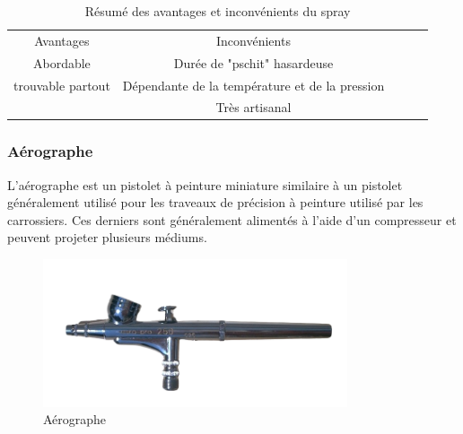 \begin{table}[H]
    \centering
    \begin{tabular}{|c|c|lll}
        \cline{1-2}
        Avantages                                 & Inconvénients                                                          &  &  & \\ \cline{1-2}
        \cellcolor[HTML]{67FD9A}Abordable         & \cellcolor[HTML]{FD6864}Durée de "pschit" hasardeuse                   &  &  & \\ \cline{1-2}
        \cellcolor[HTML]{67FD9A}trouvable partout & \cellcolor[HTML]{FD6864}Dépendante de la température et de la pression &  &  & \\ \cline{1-2}
                                                  & \cellcolor[HTML]{FD6864}Très artisanal                                 &  &  & \\ \cline{1-2}
    \end{tabular}
    \caption{Résumé des avantages et inconvénients du spray}
    \label{tab:hair_spray_table}
\end{table}

\newpage
\subsubsection{Aérographe} \label{section_aerographe}
L'aérographe est un pistolet à peinture miniature similaire à un pistolet généralement utilisé pour les traveaux de précision
à peinture utilisé par les carrossiers.
Ces derniers sont généralement alimentés à l'aide d'un compresseur et peuvent projeter plusieurs médiums.

\begin{figure}[H]
    \centering
    \includegraphics[width=0.8\textwidth]{assets/figures/etat_art/airbrush.png}
    \caption[Aérographe]{Aérographe \cite{airbrush_pics}\footnotemark}
\end{figure}

